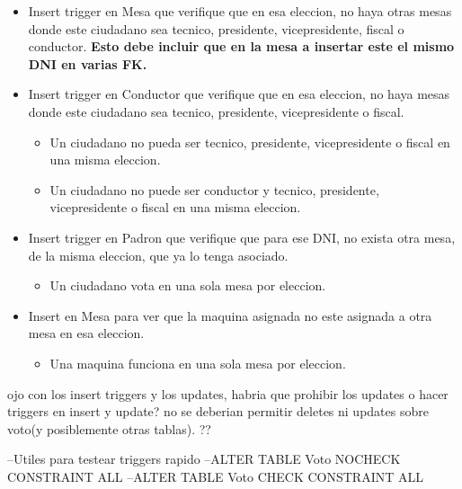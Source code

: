 \begin{itemize}
	\item Insert trigger en Mesa que verifique que en esa eleccion, no haya otras mesas donde este ciudadano sea tecnico, presidente, vicepresidente, fiscal o conductor. \textbf{Esto debe incluir que en la mesa a insertar este el mismo DNI en varias FK.}
	\item Insert trigger en Conductor que verifique que en esa eleccion, no haya  mesas donde este ciudadano sea tecnico, presidente, vicepresidente o fiscal.
		\begin{itemize}
			\item Un ciudadano no pueda ser tecnico, presidente, vicepresidente o fiscal en una misma eleccion.
			\item Un ciudadano no puede ser conductor y tecnico, presidente, vicepresidente o fiscal en una misma eleccion.
		\end{itemize}	

	\item Insert trigger en Padron que verifique que para ese DNI, no exista otra mesa, de la misma eleccion, que ya lo tenga asociado.
		\begin{itemize}
			\item Un ciudadano vota en una sola mesa por eleccion.
		\end{itemize}

	\item Insert en Mesa para ver que la maquina asignada no este asignada a otra mesa en esa eleccion.
		\begin{itemize}
			\item Una maquina funciona en una sola mesa por eleccion.
		\end{itemize}

\end{itemize}




ojo con los insert triggers y los updates, habria que prohibir los updates o hacer triggers en insert y update?
no se deberian permitir deletes ni updates sobre voto(y posiblemente otras tablas). ??


--Utiles para testear triggers rapido
--ALTER TABLE Voto NOCHECK CONSTRAINT ALL
--ALTER TABLE Voto CHECK CONSTRAINT ALL
